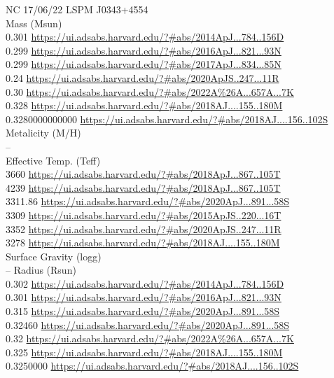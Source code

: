NC 17/06/22
LSPM J0343+4554\\
Mass (Msun)\\
0.301 \url{https://ui.adsabs.harvard.edu/?#abs/2014ApJ...784..156D}\\
0.299 \url{https://ui.adsabs.harvard.edu/?#abs/2016ApJ...821...93N}\\
0.299 \url{https://ui.adsabs.harvard.edu/?#abs/2017ApJ...834...85N}\\
0.24 \url{https://ui.adsabs.harvard.edu/?#abs/2020ApJS..247...11R}\\
0.30 \url{https://ui.adsabs.harvard.edu/?#abs/2022A%26A...657A...7K}\\
0.328 \url{https://ui.adsabs.harvard.edu/?#abs/2018AJ....155..180M}\\
0.3280000000000 \url{https://ui.adsabs.harvard.edu/?#abs/2018AJ....156..102S}\\
Metalicity (M/H)\\
--\\
Effective Temp. (Teff)\\
3660 \url{https://ui.adsabs.harvard.edu/?#abs/2018ApJ...867..105T}\\
4239 \url{https://ui.adsabs.harvard.edu/?#abs/2018ApJ...867..105T}\\
3311.86 \url{https://ui.adsabs.harvard.edu/?#abs/2020ApJ...891...58S}\\
3309 \url{https://ui.adsabs.harvard.edu/?#abs/2015ApJS..220...16T}\\
3352 \url{https://ui.adsabs.harvard.edu/?#abs/2020ApJS..247...11R}\\
3278 \url{https://ui.adsabs.harvard.edu/?#abs/2018AJ....155..180M}\\
Surface Gravity (logg)\\
--
Radius (Rsun)\\
0.302 \url{https://ui.adsabs.harvard.edu/?#abs/2014ApJ...784..156D}\\
0.301 \url{https://ui.adsabs.harvard.edu/?#abs/2016ApJ...821...93N}\\
0.315 \url{https://ui.adsabs.harvard.edu/?#abs/2020ApJ...891...58S}\\
0.32460 \url{https://ui.adsabs.harvard.edu/?#abs/2020ApJ...891...58S}\\
0.32 \url{https://ui.adsabs.harvard.edu/?#abs/2022A%26A...657A...7K}\\
0.325 \url{https://ui.adsabs.harvard.edu/?#abs/2018AJ....155..180M}\\
0.3250000 \url{https://ui.adsabs.harvard.edu/?#abs/2018AJ....156..102S}\\

